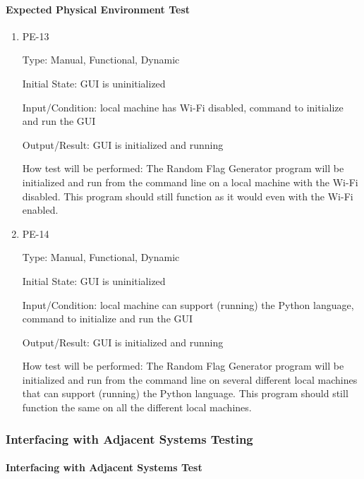 \documentclass[12pt, titlepage]{article}
\begin{document}
\paragraph{Expected Physical Environment Test}

\begin{enumerate}

\item{PE-13\\}

Type: Manual, Functional, Dynamic

Initial State: GUI is uninitialized

Input/Condition: local machine has Wi-Fi disabled, command to initialize and
run the GUI

Output/Result: GUI is initialized and running

How test will be performed: The Random Flag Generator program will be
initialized and run from the command line on a local machine with the Wi-Fi
disabled. This program should still function as it would even with the Wi-Fi
enabled.

\item{PE-14\\}

Type: Manual, Functional, Dynamic

Initial State: GUI is uninitialized

Input/Condition: local machine can support (running) the Python language,
command to initialize and run the GUI

Output/Result: GUI is initialized and running

How test will be performed: The Random Flag Generator program will be
initialized and run from the command line on several different local machines
that can support (running) the Python language. This program should still
function the same on all the different local machines.

\end{enumerate}

\subsubsection{Interfacing with Adjacent Systems Testing}

\paragraph{Interfacing with Adjacent Systems Test}
\end{document}

